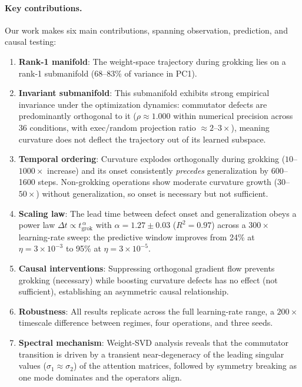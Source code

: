 \documentclass[11pt]{article}
\begin{document}
\paragraph{Key contributions.}
Our work makes six main contributions, spanning observation, prediction, and causal testing:
\begin{enumerate}
    \item \textbf{Rank-1 manifold}: The weight-space trajectory during grokking lies on a rank-1 submanifold (68--83\% of variance in PC1).
    \item \textbf{Invariant submanifold}: This submanifold exhibits strong empirical invariance under the optimization dynamics: commutator defects are predominantly orthogonal to it ($\rho \approx 1.000$ within numerical precision across 36 conditions, with exec/random projection ratio $\approx 2$--$3\times$), meaning curvature does not deflect the trajectory out of its learned subspace.
    \item \textbf{Temporal ordering}: Curvature explodes orthogonally during grokking ($10$--$1000\times$ increase) and its onset consistently \emph{precedes} generalization by 600--1600 steps. Non-grokking operations show moderate curvature growth ($30$--$50\times$) without generalization, so onset is necessary but not sufficient.
    \item \textbf{Scaling law}: The lead time between defect onset and generalization obeys a power law $\Delta t \propto t_{\mathrm{grok}}^{\,\alpha}$ with $\alpha = 1.27 \pm 0.03$ ($R^2 = 0.97$) across a $300\times$ learning-rate sweep: the predictive window improves from 24\% at $\eta = 3\!\times\!10^{-3}$ to 95\% at $\eta = 3\!\times\!10^{-5}$.
    \item \textbf{Causal interventions}: Suppressing orthogonal gradient flow prevents grokking (necessary) while boosting curvature defects has no effect (not sufficient), establishing an asymmetric causal relationship.
    \item \textbf{Robustness}: All results replicate across the full learning-rate range, a $200\times$ timescale difference between regimes, four operations, and three seeds.
    \item \textbf{Spectral mechanism}: Weight-SVD analysis reveals that the commutator transition is driven by a transient near-degeneracy of the leading singular values ($\sigma_1 \approx \sigma_2$) of the attention matrices, followed by symmetry breaking as one mode dominates and the operators align.
\end{enumerate}
\end{document}
